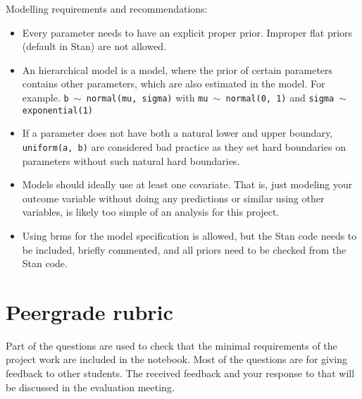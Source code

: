 \documentclass[a4paper,11pt]{article}
\begin{document}
Modelling requirements and recommendations:
\begin{itemize}
\item Every parameter needs to have an explicit proper prior. Improper flat priors (default in Stan) are not allowed.
\item An hierarchical model is a model, where the prior of certain parameters contains other parameters, which are also estimated in the model. For example. \texttt{b $\sim$ normal(mu, sigma)} with \texttt{mu $\sim$ normal(0, 1)} and \texttt{sigma $\sim$ exponential(1)}
\item If a parameter does not have both a natural lower and upper boundary, \texttt{uniform(a, b)} are considered bad practice as they set hard boundaries on parameters without such natural hard boundaries.
\item Models should ideally use at least one covariate. That is, just modeling
your outcome variable without doing any predictions or similar using other variables, is likely too simple of an analysis for this project.
\item Using brms for the model specification is allowed, but the Stan code needs to be included, briefly commented, and all priors need to be checked from the Stan code. 
\end{itemize}



\section*{Peergrade rubric}

Part of the questions are used to check that the minimal requirements
of the project work are included in the notebook. Most of the questions are for giving
feedback to other students. The received feedback and your response to
that will be discussed in the evaluation meeting.
\end{document}

